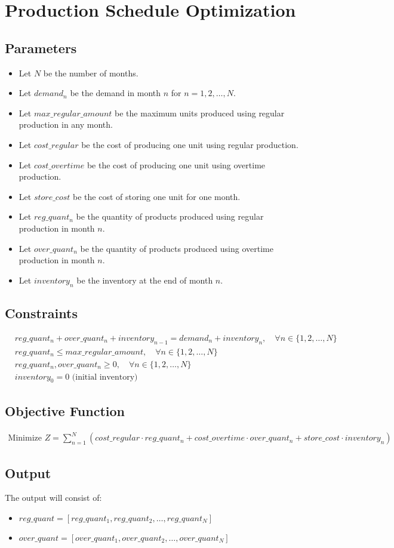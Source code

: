 \documentclass{article}
\begin{document}
\section*{Production Schedule Optimization}

\subsection*{Parameters}
\begin{itemize}
    \item Let \( N \) be the number of months.
    \item Let \( demand_n \) be the demand in month \( n \) for \( n = 1, 2, \ldots, N \).
    \item Let \( max\_regular\_amount \) be the maximum units produced using regular production in any month.
    \item Let \( cost\_regular \) be the cost of producing one unit using regular production.
    \item Let \( cost\_overtime \) be the cost of producing one unit using overtime production.
    \item Let \( store\_cost \) be the cost of storing one unit for one month.
    \item Let \( reg\_quant_n \) be the quantity of products produced using regular production in month \( n \).
    \item Let \( over\_quant_n \) be the quantity of products produced using overtime production in month \( n \).
    \item Let \( inventory_n \) be the inventory at the end of month \( n \).
\end{itemize}

\subsection*{Constraints}
\begin{align}
    & reg\_quant_n + over\_quant_n + inventory_{n-1} = demand_n + inventory_n, \quad \forall n \in \{1, 2, \ldots, N\} \\
    & reg\_quant_n \leq max\_regular\_amount, \quad \forall n \in \{1, 2, \ldots, N\} \\
    & reg\_quant_n, over\_quant_n \geq 0, \quad \forall n \in \{1, 2, \ldots, N\} \\
    & inventory_0 = 0 \text{ (initial inventory)}
\end{align}

\subsection*{Objective Function}
\begin{align}
    \text{Minimize } Z = \sum_{n=1}^{N} \left( cost\_regular \cdot reg\_quant_n + cost\_overtime \cdot over\_quant_n + store\_cost \cdot inventory_n \right)
\end{align}

\subsection*{Output}
The output will consist of:
\begin{itemize}
    \item \( reg\_quant = [reg\_quant_1, reg\_quant_2, \ldots, reg\_quant_N] \)
    \item \( over\_quant = [over\_quant_1, over\_quant_2, \ldots, over\_quant_N] \)
\end{itemize}
\end{document}
